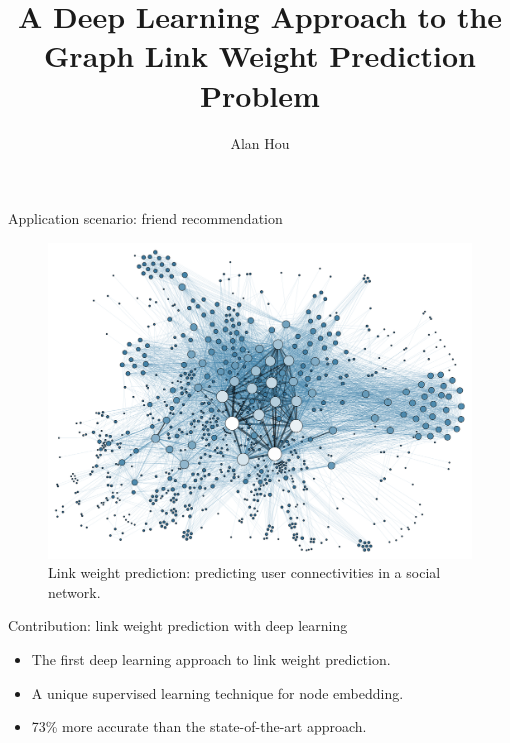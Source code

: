 \documentclass{beamer}
\title{A Deep Learning Approach to the Graph Link Weight Prediction Problem}
\author{Alan Hou}
\date{}
\begin{document}

\begin{frame}{Application scenario: friend recommendation}
	\begin{figure}[H]\centering
		\includegraphics[width=0.7\linewidth]{Social_Network_Analysis_Visualization}
		\caption{
			Link weight prediction: predicting user connectivities in a social network.
		}
		\label{fig:Social_Network_Analysis_Visualization}
	\end{figure}
\end{frame}

\begin{frame}{Contribution: link weight prediction with deep learning}
	\begin{itemize}
		\item The first deep learning approach to link weight prediction.
		\item A unique supervised learning technique for node embedding.
		\item 73\% more accurate than the state-of-the-art approach.
	\end{itemize}
\end{frame}
\end{document}
